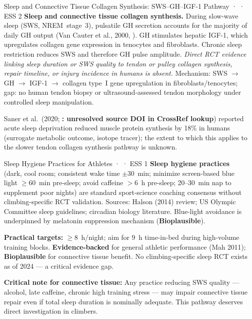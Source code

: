 \begin{bioplausbox}{Sleep and Connective Tissue Collagen Synthesis: SWS--GH--IGF-1 Pathway · \bioplausible · ESS 2}
\textbf{Sleep and connective tissue collagen synthesis.} During slow-wave sleep (SWS, NREM~stage~3), pulsatile GH secretion accounts for the majority of daily GH output (Van Cauter et al., 2000, \cite{Van00}). GH stimulates hepatic IGF-1, which upregulates collagen gene expression in tenocytes and fibroblasts. Chronic sleep restriction reduces SWS and therefore GH pulse amplitude. \emph{Direct RCT evidence linking sleep duration or SWS quality to tendon or pulley collagen synthesis, repair timeline, or injury incidence in humans is absent.} Mechanism: SWS $\to$ GH $\to$ IGF-1 $\to$ collagen type~I gene upregulation in fibroblasts/tenocytes; gap: no human tendon biopsy or ultrasound-assessed tendon morphology under controlled sleep manipulation.

Saner et al.\ (2020; \textbf{\toverify: unresolved source DOI in CrossRef lookup}) reported acute sleep deprivation reduced muscle protein synthesis by 18\% in humans (surrogate metabolic outcome, isotope tracer); the extent to which this applies to the slower tendon collagen synthesis pathway is unknown.
\end{bioplausbox}

\begin{folklorebox}{Sleep Hygiene Practices for Athletes · \folkloreverified · ESS 1}
\textbf{Sleep hygiene practices} (dark, cool room; consistent wake time $\pm$30~min; minimize screen-based blue light $\geq$60~min pre-sleep; avoid caffeine $>$6~h pre-sleep; 20--30~min nap to supplement poor nights) are standard sport-science coaching consensus without climbing-specific RCT validation. Sources: Halson (2014) review; US Olympic Committee sleep guidelines; circadian biology literature. Blue-light avoidance is underpinned by melatonin suppression mechanism (\textbf{Bioplausible}).
\end{folklorebox}

\textbf{Practical targets:} $\geq$8~h/night; aim for 9~h time-in-bed during high-volume training blocks. \textbf{Evidence-backed} for general athletic performance (Mah 2011); \textbf{Bioplausible} for connective tissue benefit. No climbing-specific sleep RCT exists as of 2024 --- a critical evidence gap.

\textbf{Critical note for connective tissue:} Any practice reducing SWS quality --- alcohol, late caffeine, chronic high training stress --- may impair connective tissue repair even if total sleep duration is nominally adequate. This pathway deserves direct investigation in climbers.

